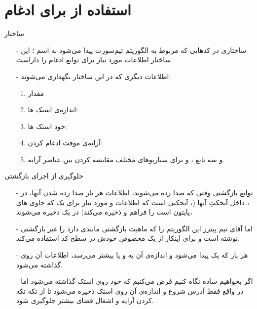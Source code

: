 \section{استفاده از  برای ادغام}
\begin{frame}{ساختار }
\begin{itemize}\itemr
\item[-]
ساختاری در کد‌هایی که مربوط به الگوریتم تیم‌سورت پیدا می‌شود به اسم ؛ این ساختار اطلاعات مورد نیاز برای توابع ادغام را داراست.

\item[-]
اطلاعات دیگری که در این ساختار نگهداری می‌شوند:
\begin{enumerate}\itemr
\item 
مقدار 

\item 
اندازه‌ی استک ها:

\item 
خود استک ها:

\item 
آرایه‌ی موقت ادغام کردن:

\item 
و سه تابع
،
 و
برای سناریو‌های مختلف مقایسه کردن بین عناصر آرایه.
\end{enumerate}
\end{itemize}
\end{frame}

\begin{frame}{جلوگیری از اجرای بازگشتی}
\begin{itemize}\itemr
\item[-]
توابع بازگشتی وقتی که صدا زده می‌شوند، اطلاعات هر بار صدا زده شدن آنها، در
،
داخل آبجکتِ
آنها (، آبجکتی است که اطلاعات و  مورد نیاز برای یک  که حاوی ‌های پایتون است را فراهم و ذخیره می‌کند) در یک  ذخیره می‌شوند،

\item[-]
اما آقای تیم پیترز این الگوریتم را که ماهیت بازگشتی مانندی دارد را غیر بازگشتی نوشته است و برای اینکار از یک  مخصوص خودش در سطح کد استفاده می‌کند.

\item[-]
هر بار که یک  پیدا می‌شود و اندازه‌ی آن به  و یا بیشتر می‌رسد، اطلاعات آن روی  گذاشته می‌شود.

\item[-]
اگر بخواهیم ساده نگاه کنیم فرض می‌کنیم که خود  روی استک گذاشته می‌شود اما در واقع فقط آدرس شروع و اندازه‌ی آن روی استک ذخیره می‌شود تا از تکه تکه کردن آرایه و اشغال فضای بیشتر جلوگیری شود.
\end{itemize}
\end{frame}
